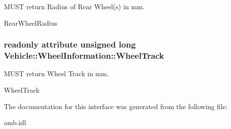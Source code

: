 M\-U\-S\-T return Radius of Rear Wheel(s) in mm. 

Rear\-Wheel\-Radius \hypertarget{interfaceVehicle_1_1WheelInformation_aac11e08b85cccc37f8383b9ccbd6819d}{
\subsubsection[{Wheel\-Track}]{\setlength{\rightskip}{0pt plus 5cm}readonly attribute unsigned long Vehicle\-::\-Wheel\-Information\-::\-Wheel\-Track}}\label{interfaceVehicle_1_1WheelInformation_aac11e08b85cccc37f8383b9ccbd6819d}


M\-U\-S\-T return Wheel Track in mm. 

Wheel\-Track 

The documentation for this interface was generated from the following file\-:\begin{DoxyCompactItemize}
\item 
amb.\-idl\end{DoxyCompactItemize}
